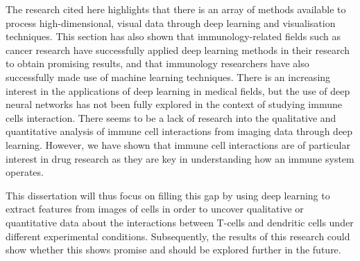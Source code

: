 The research cited here highlights that there is an array of methods available to process high-dimensional, visual data through deep learning and visualisation techniques. This section has also shown that immunology-related fields such as cancer research have successfully applied deep learning methods in their research to obtain promising results, and that immunology researchers have also successfully made use of machine learning techniques. There is an increasing interest in the applications of deep learning in medical fields, but the use of deep neural networks has not been fully explored in the context of studying immune cells interaction. There seems to be a lack of research into the qualitative and quantitative analysis of immune cell interactions from imaging data through deep learning. However, we have shown that immune cell interactions are of particular interest in drug research as they are key in understanding how an immune system operates. %

This dissertation will thus focus on filling this gap by using deep learning to extract features from images of cells in order to uncover qualitative or quantitative data about the interactions between T-cells and dendritic cells under different experimental conditions. Subsequently, the results of this research could show whether this shows promise and should be explored further in the future.
